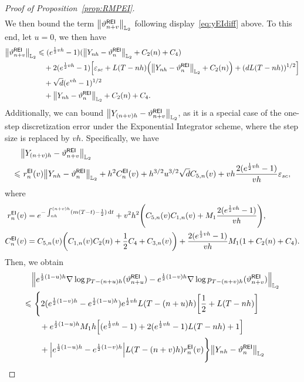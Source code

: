 \begin{proof}[Proof of Proposition~\ref{prop:RMPEI}]
\begin{align*}
\end{align*}
We then bound the term $\l|\vartheta_{n+v}^{\sf REI}\r|_{\Ltwo}$ following display~\eqref{eq:yEIdiff} above. 
To this end, let $u=0$, we then have
\begin{align*}
    \l|\vartheta_{n+v}^{\sf REI}\r|_{\Ltwo}
    &\leqslant (e^{\frac{1}{2}vh}-1)(\l|Y_{nh}-\vartheta_n^{\sf REI}\r|_{\Ltwo}+C_2(n)+C_4)\\
    &\quad+2(e^{\frac{1}{2}vh}-1)\left[\varepsilon_{sc}+L(T-nh)\left(\l|Y_{nh}-\vartheta_n^{\sf REI}\r|_{\Ltwo}+C_2(n)\right)+(dL(T-nh))^{1/2}\right]\\
    &\quad +\sqrt{d}(e^{vh}-1)^{1/2}\\
    &\quad +\l|Y_{nh}-\vartheta_n^{\sf REI}\r|_{\Ltwo}+C_2(n)+C_4.
\end{align*}
Additionally, we can bound $\l|Y_{(n+v)h}-\vartheta_{n+v}^{\sf REI}\r|_{\Ltwo}$, as it is a special case of the one-step discretization error under the Exponential Integrator scheme, where the step size is replaced by $vh$.
Specifically, we have
\begin{align*}
    &\l|Y_{(n+v)h}-\vartheta_{n+v}^{\sf REI}\r|_{\Ltwo}\\
    \leqslant &\,\,r_n^{\sf EI}(v)\l|Y_{nh}-\vartheta_n^{\sf REI}\r|_{\Ltwo}+h^2C_n^{\sf EI}(v)+h^{3/2}u^{3/2}\sqrt{d}C_{5,n}(v)+vh\dfrac{2(e^{\frac{1}{2}vh}-1)}{vh}\varepsilon_{sc},
\end{align*}
where
\begin{align*}
    r_n^{\sf EI}(v)&=e^{-\int_{nh}^{(n+v)h}(m(T-t)-\frac{1}{2})\rmd t}+v^2h^2\left(C_{5,n}(v)C_{1,n}(v)+M_1\dfrac{2(e^{\frac{1}{2}vh}-1)}{vh}\right),\\
    C_n^{\sf EI}(v)&=C_{5,n}(v)\left(C_{1,n}(v)C_2(n)+\dfrac{1}{2}C_4+C_{3,n}(v)\right)+\dfrac{2(e^{\frac{1}{2}vh}-1)}{vh}M_1(1+C_2(n)+C_4).
\end{align*}
Then, we obtain
\begin{align*}
    &\left\lVert e^{\frac{1}{2}(1-u)h}\nabla\log p_{T-(n+u)h}(\vartheta_{n+u}^{\sf REI})-e^{\frac{1}{2}(1-v)h}\nabla\log p_{T-(n+v)h}(\vartheta_{n+v}^{\sf REI})\right\rVert_{\Ltwo}\\
    \leqslant & \,\,\Bigg\{2(e^{\frac{1}{2}(1-v)h}-e^{\frac{1}{2}(1-u)h})e^{\frac{1}{2}vh}L(T-(n+u)h)\left[\dfrac{1}{2}+L(T-nh)\right]\\
    &\quad +e^{\frac{1}{2}(1-u)h}M_1h\left[(e^{\frac{1}{2}vh}-1)+2(e^{\frac{1}{2}vh}-1)L(T-nh)+1\right]\\
    &\quad +\left|e^{\frac{1}{2}(1-u)h}-e^{\frac{1}{2}(1-v)h}\right|L(T-(n+v)h)r_n^{\sf EI}(v)\Bigg\}\l|Y_{nh}-\vartheta_n^{\sf REI}\r|_{\Ltwo}\\

\end{align*}
\end{proof}

